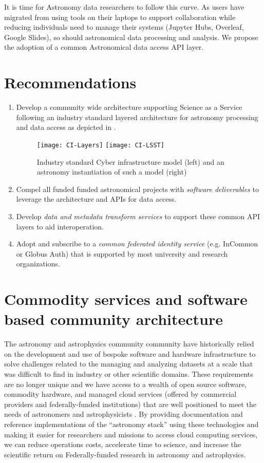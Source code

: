 It is time for Astronomy data researchers to follow this curve. As users have migrated
from using tools on their laptops to support collaboration while reducing
individuals need to manage their systems (Jupyter Hubs, Overleaf, Google Slides),
so should astronomical data processing and analysis. We propose the adoption of
a common Astronomical data access \gls{API} layer.


\section{Recommendations }
\begin{enumerate}
 \item Develop a community wide architecture supporting Science as a Service following
	an industry  standard layered architecture for astronomy processing and data access as
depicted in .


\begin{figure}
\centering
\texttt{[image: CI-Layers]}
\texttt{[image: CI-LSST]}
\caption{Industry standard Cyber infrastructure model (left) and an astronomy instantiation of such a model (right)\label{fig:ci}}
\end{figure}

\item Compel all funded funded astronomical projects with \emph{software deliverables} to  leverage the architecture and  APIs for data access.

\item Develop \emph{data and \gls{metadata} transform services}
to support these common \gls{API} layers to aid interoperation.

\item Adopt and subscribe to a \emph{common federated identity service} (e.g. InCommon or
Globus Auth) that is supported by most university and research organizations.
\end{enumerate}




\section{Commodity services and software based community architecture} \label{sec:refarc}
The astronomy and astrophysics community community have historically relied on the development and use of bespoke software and hardware infrastructure to solve challenges related to the managing and analyzing datasets at a scale that was difficult to find in industry or other scientific domains.
These requirements are no longer unique and we have access to a wealth of open source software, commodity hardware, and managed cloud services (offered by commercial providers and federally-funded institutions) that are well positioned to meet the needs of astronomers and astrophysicists \cite{2019AAS...23345706M, 2019AAS...23324505B}.
By providing documentation and reference implementations of the “astronomy \gls{stack}” using these technologies and making it easier for researchers and missions to access cloud computing services, we can reduce operations costs, accelerate time to science, and increase the scientific return on Federally-funded research in astronomy and astrophysics.


